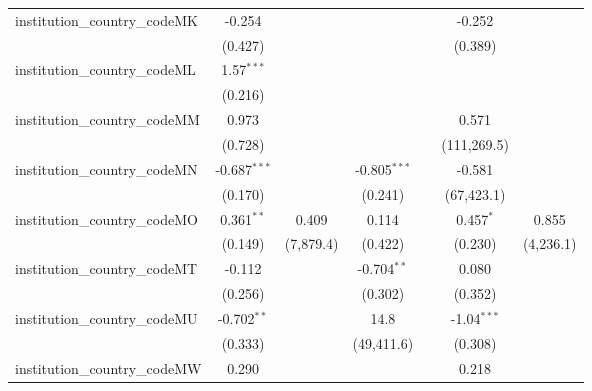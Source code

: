 \begin{tabular}{lcccccc}
   institution\_country\_codeMK          & -0.254         &               &                &               & -0.252         &   \\   
                                         & (0.427)        &               &                &               & (0.389)        &   \\   
   institution\_country\_codeML          & 1.57$^{***}$   &               &                &               &                &   \\   
                                         & (0.216)        &               &                &               &                &   \\   
   institution\_country\_codeMM          & 0.973          &               &                &               & 0.571          &   \\   
                                         & (0.728)        &               &                &               & (111,269.5)    &   \\   
   institution\_country\_codeMN          & -0.687$^{***}$ &               & -0.805$^{***}$ &               & -0.581         &   \\   
                                         & (0.170)        &               & (0.241)        &               & (67,423.1)     &   \\   
   institution\_country\_codeMO          & 0.361$^{**}$   & 0.409         & 0.114          &               & 0.457$^{*}$    & 0.855\\   
                                         & (0.149)        & (7,879.4)     & (0.422)        &               & (0.230)        & (4,236.1)\\   
   institution\_country\_codeMT          & -0.112         &               & -0.704$^{**}$  &               & 0.080          &   \\   
                                         & (0.256)        &               & (0.302)        &               & (0.352)        &   \\   
   institution\_country\_codeMU          & -0.702$^{**}$  &               & 14.8           &               & -1.04$^{***}$  &   \\   
                                         & (0.333)        &               & (49,411.6)     &               & (0.308)        &   \\   
   institution\_country\_codeMW          & 0.290          &               &                &               & 0.218          &   \\   

\end{tabular}
